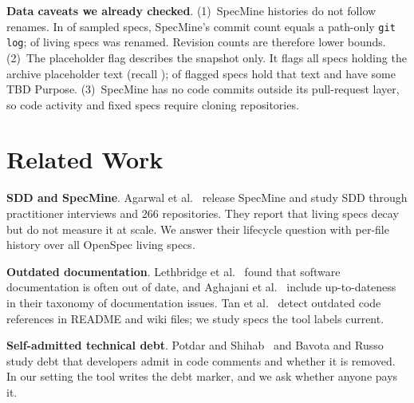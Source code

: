 \documentclass[10pt, conference]{IEEEtran}
\renewcommand{\paragraph}[1]{\noindent\textbf{#1}.}
\begin{document}
\paragraph{Data caveats we already checked} (1)~SpecMine histories do not follow renames.
In \numRenamePlainMatch of \numRenameChecked sampled specs, SpecMine's commit count equals a
path-only \texttt{git log}; \numRenameLivingTrue of \numRenameLivingChecked living specs was renamed. Revision counts are therefore lower bounds. (2)~The placeholder flag describes the snapshot only. It flags all \numArchivePlaceholder
specs holding the archive placeholder text (recall \pctFlagRecall); \pctFlagPrecision of
flagged specs hold that text and \pctFlagPurposeTbd have some TBD Purpose. (3)~SpecMine has no code commits outside its pull-request layer, so
code activity and fixed specs require cloning repositories.

\section{Related Work}
\label{sec:related}

\paragraph{SDD and SpecMine} Agarwal et al.~\cite{specmine_paper} release SpecMine and study
SDD through practitioner interviews and 266 repositories. They report that living specs
decay but do not measure it at scale. We answer their lifecycle question with per-file
history over all \numLiving OpenSpec living specs.

\paragraph{Outdated documentation} Lethbridge et al.~\cite{lethbridge2003} found that
software documentation is often out of date, and Aghajani et al.~\cite{aghajani2019} include
up-to-dateness in their taxonomy of documentation issues. Tan et al.~\cite{tan2024} detect
outdated code references in README and wiki files; we study specs the tool labels current.

\paragraph{Self-admitted technical debt} Potdar and Shihab~\cite{potdar2014} and Bavota and
Russo~\cite{bavota2016} study debt that developers admit in code comments and whether it is
removed. In our setting the tool writes the debt marker, and we ask whether anyone pays it.
\end{document}
